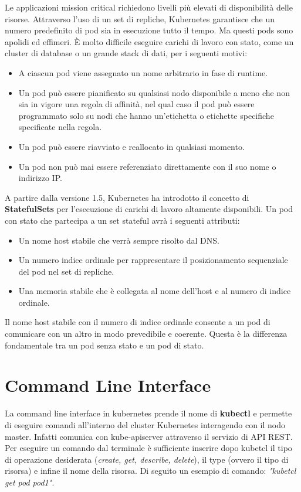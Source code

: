 \documentclass[12pt, a4paper]{report}
\begin{document}
Le applicazioni mission critical richiedono livelli più elevati di disponibilità delle risorse. Attraverso l'uso di un set di repliche, Kubernetes garantisce che un numero predefinito di pod sia in esecuzione tutto il tempo. Ma questi pods sono apolidi ed effimeri. È molto difficile eseguire carichi di lavoro con stato, come un cluster di database o un grande stack di dati, per i seguenti motivi:
\begin{itemize}
  \item A ciascun pod viene assegnato un nome arbitrario in fase di runtime.
  \item Un pod può essere pianificato su qualsiasi nodo disponibile a meno che non sia in vigore una regola di affinità, nel qual caso il pod può essere programmato solo su nodi che hanno un'etichetta o etichette specifiche specificate nella regola.
  \item Un pod può essere riavviato e reallocato in qualsiasi momento.
  \item Un pod non può mai essere referenziato direttamente con il suo nome o indirizzo IP.
\end{itemize}
A partire dalla versione 1.5, Kubernetes ha introdotto il concetto di \textbf{StatefulSets} per l'esecuzione di carichi di lavoro altamente disponibili. Un pod con stato che partecipa a un set stateful avrà i seguenti attributi:
\begin{itemize}
  \item Un nome host stabile che verrà sempre risolto dal DNS.
  \item Un numero indice ordinale per rappresentare il posizionamento sequenziale del pod nel set di repliche.
  \item Una memoria stabile che è collegata al nome dell'host e al numero di indice ordinale.
\end{itemize}
Il nome host stabile con il numero di indice ordinale consente a un pod di comunicare con un altro in modo prevedibile e coerente. Questa è la differenza fondamentale tra un pod senza stato e un pod di stato.
\section{Command Line Interface}
La command line interface in kubernetes prende il nome di \textbf{kubectl} e permette di eseguire comandi all'interno del cluster Kubernetes interagendo con il nodo master. Infatti comunica con kube-apiserver attraverso il servizio di API REST. Per eseguire un comando dal terminale è sufficiente inserire dopo kubetcl il tipo di operazione desiderata (\textit{create, get, describe, delete}), il type (ovvero il tipo di risorsa) e infine il nome della risorsa. Di seguito un esempio di comando: \textit{"kubetcl get pod pod1"}.
\end{document}
